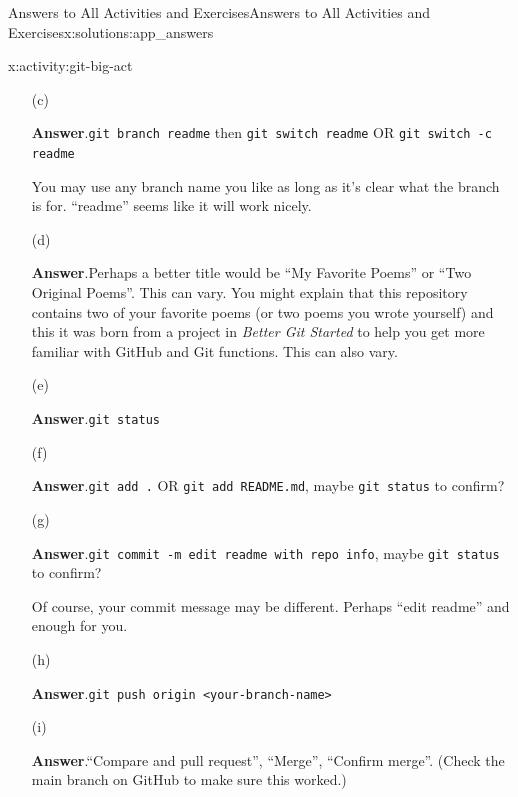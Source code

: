 \documentclass[oneside,10pt,]{book}
\newcommand{\blocktitlefont}{\relax}
\newcommand{\mono}[1]{\texttt{#1}}
\newcommand{\pubtitle}[1]{\textsl{#1}}
\begin{document}
\begin{solutions-chapter}{Answers to All Activities and Exercises}{}{Answers to All Activities and Exercises}{}{}{x:solutions:app_answers}
\begin{activitysolution}{4.11}{}{x:activity:git-big-act}
\begin{enumerate}[font=\bfseries,label=(\alph*),ref=\alph*]
\par\smallskip%
\noindent\textbf{\blocktitlefont Answer}.\hypertarget{g:answer:idm479683928-back}{}\quad{}Copy the HTTPS link on GitHub. Use \mono{git clone <copied-link>}. Use \mono{cd <repo-name>} to move your terminal into that repo.%
\item[(c)]\par\smallskip%
\noindent\textbf{\blocktitlefont Answer}.\hypertarget{g:answer:idm479679960-back}{}\quad{}\mono{git branch readme} then \mono{git switch readme} OR \mono{git switch -c readme}%
\par
You may use any branch name you like as long as it's clear what the branch is for. ``readme'' seems like it will work nicely.%
\item[(d)]\par\smallskip%
\noindent\textbf{\blocktitlefont Answer}.\hypertarget{g:answer:idm479684312-back}{}\quad{}Perhaps a better title would be ``My Favorite Poems'' or ``Two Original Poems''. This can vary. You might explain that this repository contains two of your favorite poems (or two poems you wrote yourself) and this it was born from a project in \pubtitle{Better Git Started} to help you get more familiar with GitHub and Git functions. This can also vary.%
\item[(e)]\par\smallskip%
\noindent\textbf{\blocktitlefont Answer}.\hypertarget{g:answer:idm479675480-back}{}\quad{}\mono{git status}%
\item[(f)]\par\smallskip%
\noindent\textbf{\blocktitlefont Answer}.\hypertarget{g:answer:idm479670488-back}{}\quad{}\mono{git add .} OR \mono{git add README.md}, maybe \mono{git status} to confirm?%
\item[(g)]\par\smallskip%
\noindent\textbf{\blocktitlefont Answer}.\hypertarget{g:answer:idm479670232-back}{}\quad{}\mono{git commit -m \textquotesingle{}edit readme with repo info\textquotesingle{}}, maybe \mono{git status} to confirm?%
\par
Of course, your commit message may be different. Perhaps ``edit readme'' and enough for you.%
\item[(h)]\par\smallskip%
\noindent\textbf{\blocktitlefont Answer}.\hypertarget{g:answer:idm479674328-back}{}\quad{}\mono{git push origin <your-branch-name>}%
\item[(i)]\par\smallskip%
\noindent\textbf{\blocktitlefont Answer}.\hypertarget{g:answer:idm479663832-back}{}\quad{}``Compare and pull request'', ``Merge'', ``Confirm merge''. (Check the main branch on GitHub to make sure this worked.)%

\end{enumerate}
\end{activitysolution}
\end{solutions-chapter}
\end{document}
